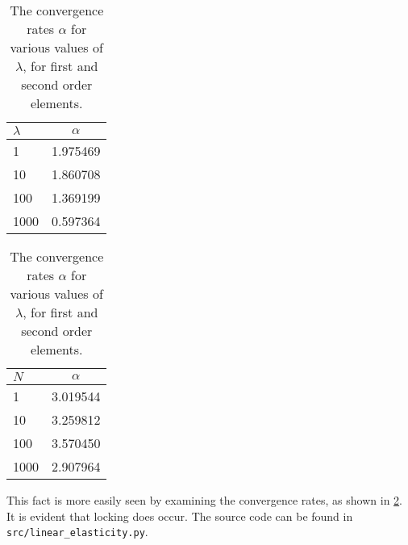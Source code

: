 \documentclass[twocolumn, article]{memoir}
\begin{document}
\begin{table}[htpb]
    \centering
    \caption{The convergence rates \( \alpha \) for various values of
    \(\lambda\), for first and second order elements.}
    \label{tab:convergence}

    \begin{minipage}{.4\linewidth}
    \begin{tabular}{lc}
    \toprule
    {\(\lambda\)} & \(\alpha\) \\
    \midrule
    1    &  1.975469 \\
    10   &  1.860708 \\
    100  &  1.369199 \\
    1000 &  0.597364 \\
    \bottomrule
    \end{tabular}
    \end{minipage}%
    \begin{minipage}{.4\linewidth}
        \begin{tabular}{lc}
        \toprule
        {\(N\)} &     \(\alpha\) \\
        \midrule
        1    &  3.019544 \\
        10   &  3.259812 \\
        100  &  3.570450 \\
        1000 &  2.907964 \\
        \bottomrule
        \end{tabular}
    \end{minipage}
\end{table}
This fact is more easily seen by examining the convergence rates, as shown in
\cref{tab:convergence}. It is evident that locking does occur. The source code
can be found in \texttt{src/linear\_elasticity.py}.
\end{document}

